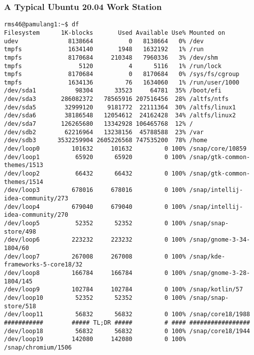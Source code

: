 \documentclass[aspectratio=169, xcolor=table, notheorems, hyperref={pdfpagelabels=false}]{beamer}
\begin{document}
\begin{frame}[fragile]
\frametitle{A Typical Ubuntu 20.04 Work Station}
\begin{lstlisting}[basicstyle=\ttfamily\tiny]
rms46@pamulang1:~$ df
Filesystem      1K-blocks       Used Available Use% Mounted on
udev              8138664          0   8138664   0% /dev
tmpfs             1634140       1948   1632192   1% /run
tmpfs             8170684     210348   7960336   3% /dev/shm
tmpfs                5120          4      5116   1% /run/lock
tmpfs             8170684          0   8170684   0% /sys/fs/cgroup
tmpfs             1634136         76   1634060   1% /run/user/1000
/dev/sda1           98304      33523     64781  35% /boot/efi
/dev/sda3       286082372   78565916 207516456  28% /altfs/ntfs
/dev/sda5        32999120    9181772  22111364  30% /altfs/linux1
/dev/sda6        38186548   12054612  24162428  34% /altfs/linux2
/dev/sda7       126265680   13342928 106465768  12% /
/dev/sdb2        62216964   13238156  45788588  23% /var
/dev/sdb3      3532259904 2605226568 747535200  78% /home
/dev/loop0         101632     101632         0 100% /snap/core/10859
/dev/loop1          65920      65920         0 100% /snap/gtk-common-themes/1513
/dev/loop2          66432      66432         0 100% /snap/gtk-common-themes/1514
/dev/loop3         678016     678016         0 100% /snap/intellij-idea-community/273
/dev/loop4         679040     679040         0 100% /snap/intellij-idea-community/270
/dev/loop5          52352      52352         0 100% /snap/snap-store/498
/dev/loop6         223232     223232         0 100% /snap/gnome-3-34-1804/60
/dev/loop7         267008     267008         0 100% /snap/kde-frameworks-5-core18/32
/dev/loop8         166784     166784         0 100% /snap/gnome-3-28-1804/145
/dev/loop9         102784     102784         0 100% /snap/kotlin/57
/dev/loop10         52352      52352         0 100% /snap/snap-store/518
/dev/loop11         56832      56832         0 100% /snap/core18/1988
###########        ##### TL;DR #####         # #### #################
/dev/loop18         56832      56832         0 100% /snap/core18/1944
/dev/loop19        142080     142080         0 100% /snap/chromium/1506
\end{lstlisting}
\end{frame}

\end{document}

